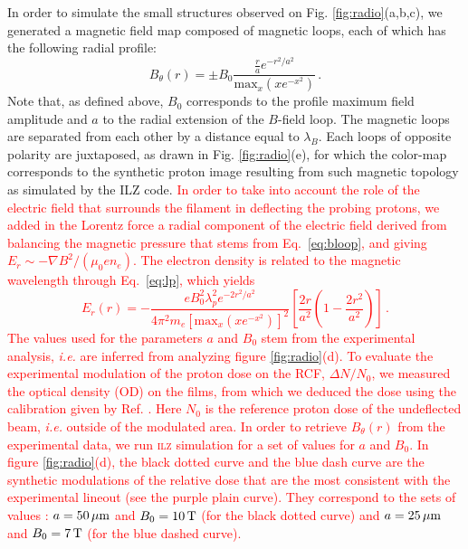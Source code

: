 \documentclass[aps,twocolumn,showpacs,superscriptaddress]{revtex4}
\begin{document}
In order to simulate the small structures observed on Fig. \ref{fig:radio}(a,b,c), we generated a magnetic field map composed of magnetic loops, each of which has the following radial profile:
\begin{equation}\label{eq:bloop}
B_\theta(r)  = \pm B_0  \frac{ \frac{r}{a} e^{-r^2/a^2} }{\mathrm{max}_x(xe^{-x^2})} \, .
\end{equation} %
Note that, as defined above, $B_0$ corresponds to the profile maximum field amplitude and $a$ to the radial extension of the $B$-field loop.
The magnetic loops are separated from each other by a distance equal to $\lambda_B$.
Each loops of opposite polarity are juxtaposed, as drawn in Fig. \ref{fig:radio}(e), for which the color-map corresponds to the synthetic proton image resulting from such magnetic topology as simulated by the ILZ code.
\textcolor{red}{
In order to take into account the role of the electric field that surrounds the filament in deflecting the probing protons, we added in the Lorentz force a radial component of the electric field  derived from balancing the magnetic pressure that stems from Eq.~\eqref{eq:bloop}, and giving $E_r \sim -\nabla B^2 /(\mu_0e n_e)$. The  electron density is related to the magnetic wavelength through Eq.~\eqref{eq:lp}, which yields
\begin{equation}\label{eq:eloop}
E_r(r) = -\frac{  eB_0^2\lambda_p^2   e^{-2r^2/a^2}}{4\pi^2 m_e [\mathrm{max}_x(xe^{-x^2})]^2} \left[ \frac{2r}{a^2}\left( 1-\frac{2r^2}{a^2}\right)  \right]  \, .
\end{equation} 
The values used for the parameters $a$ and $B_0$ stem from the experimental analysis, \emph{i.e.} are inferred from analyzing figure \ref{fig:radio}(d). 
To evaluate the experimental modulation of the proton dose on the RCF, $\Delta N/N_0$, we measured the optical density (OD) on the films, from which we deduced the dose using the calibration given by Ref. \cite{RSI_Chen_2016}. Here $N_0$ is the reference proton dose of the undeflected beam, \emph{i.e.} outside of the modulated area. In order to retrieve  $B_\theta(r)$ from the experimental data, we run \textsc{ilz} simulation for a set of values for $a$ and $B_0$. In figure \ref{fig:radio}(d), the black dotted curve and the blue dash curve are the synthetic modulations of the relative dose that are the most consistent with the experimental lineout (see the purple plain curve). They correspond to the  sets of values : $a=50\,\rm \mu m$ and $B_0=10\,\rm T$ (for the black dotted curve) and $a=25\,\rm \mu m$ and $B_0=7\,\rm T$ (for the blue dashed curve).
}
\end{document}
